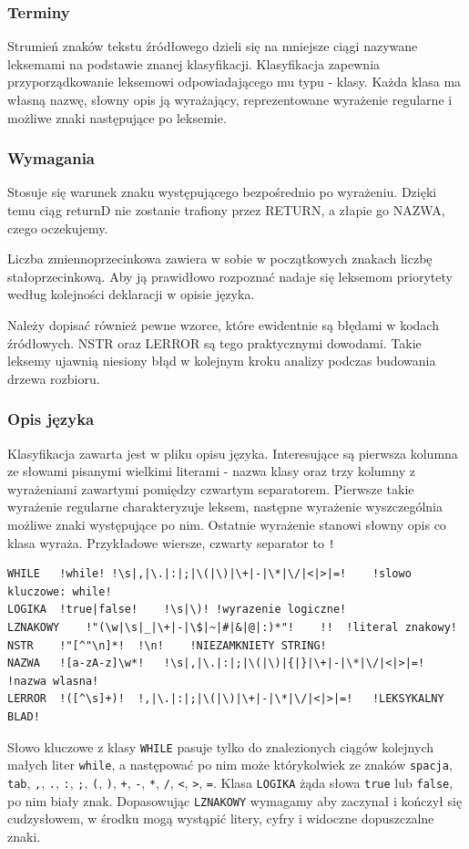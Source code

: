 \documentclass[a4paper,12pt]{article}
\begin{document}
\subsubsection{Terminy}
Strumień znaków tekstu źródłowego dzieli się na mniejsze ciągi nazywane leksemami na podstawie znanej klasyfikacji. Klasyfikacja zapewnia przyporządkowanie leksemowi odpowiadającego mu typu - klasy. Każda klasa ma własną nazwę, słowny opis ją wyrażający, reprezentowane wyrażenie regularne i możliwe znaki następujące po leksemie.
\subsubsection{Wymagania}
Stosuje się warunek znaku występującego bezpośrednio po wyrażeniu. Dzięki temu ciąg returnD nie zostanie trafiony przez RETURN, a złapie go NAZWA, czego oczekujemy.

Liczba zmiennoprzecinkowa zawiera w sobie w początkowych znakach liczbę stałoprzecinkową. Aby ją prawidłowo rozpoznać nadaje się leksemom priorytety według kolejności deklaracji w opisie języka.

Należy dopisać również pewne wzorce, które ewidentnie są błędami w kodach źródłowych. NSTR oraz LERROR są tego praktycznymi dowodami. Takie leksemy ujawnią niesiony błąd w kolejnym kroku analizy podczas budowania drzewa rozbioru.

\subsubsection{Opis języka}
Klasyfikacja zawarta jest w pliku opisu języka. Interesujące są pierwsza kolumna ze słowami pisanymi wielkimi literami - nazwa klasy oraz trzy kolumny z wyrażeniami zawartymi pomiędzy czwartym separatorem. Pierwsze takie wyrażenie regularne charakteryzuje leksem, następne wyrażenie wyszczególnia możliwe znaki występujące po nim. Ostatnie wyrażenie stanowi słowny opis co klasa wyraża. Przykładowe wiersze, czwarty separator to \verb|!|
\begin{verbatim}
WHILE	!while!	!\s|,|\.|:|;|\(|\)|\+|-|\*|\/|<|>|=!	!slowo kluczowe: while!
LOGIKA	!true|false!	!\s|\)!	!wyrazenie logiczne!
LZNAKOWY	!"(\w|\s|_|\+|-|\$|~|#|&|@|:)*"!	!!	!literal znakowy!
NSTR	!"[^"\n]*!	!\n!	!NIEZAMKNIETY STRING!
NAZWA	![a-zA-z]\w*!	!\s|,|\.|:|;|\(|\)|{|}|\+|-|\*|\/|<|>|=!	!nazwa wlasna!
LERROR	!([^\s]+)!	!,|\.|:|;|\(|\)|\+|-|\*|\/|<|>|=!	!LEKSYKALNY BLAD!
\end{verbatim}
Słowo kluczowe z klasy \verb|WHILE| pasuje tylko do znalezionych ciągów kolejnych małych liter \verb|while|, a następować po nim może którykolwiek ze znaków \verb|spacja|, \verb|tab|, \verb|,|, \verb|.|, \verb|:|, \verb|;|, \verb|(|, \verb|)|, \verb|+|, \verb|-|, \verb|*|, \verb|/|, \verb|<|, \verb|>|, \verb|=|. Klasa \verb|LOGIKA| żąda słowa \verb|true| lub \verb|false|, po nim biały znak. Dopasowując \verb|LZNAKOWY| wymagamy aby zaczynał i kończył się cudzysłowem, w środku mogą wystąpić litery, cyfry i widoczne dopuszczalne znaki.
\end{document}
